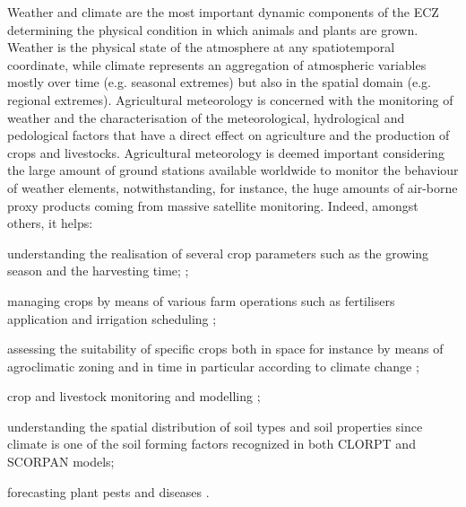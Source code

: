 \documentclass[authoryear,preprint,review,12pt]{elsarticle}
\begin{document}

Weather and climate are the most important dynamic components of the ECZ determining the physical condition in which animals and plants are grown.
Weather is the physical state of the atmosphere at any spatiotemporal coordinate, while climate represents an aggregation of atmospheric variables mostly over time (e.g. seasonal extremes) but also in the spatial domain (e.g. regional extremes).
Agricultural meteorology is concerned with the monitoring of weather and the characterisation of the meteorological, hydrological and pedological factors that have a direct effect on agriculture and the production of crops and livestocks.
Agricultural meteorology is deemed important considering the large amount of ground stations available worldwide to monitor the behaviour of weather elements, notwithstanding, for instance, the huge amounts of air-borne proxy products coming from massive satellite monitoring.
Indeed, amongst others, it helps: 
    \begin{enumerate*}
        \item understanding the realisation of several crop parameters such as the growing season and the harvesting time;  \citep{Hoogenboom:agrometeo-swat:2000,Chou2019,Madhukar2021,Richmond2022};
        \item managing crops by means of various farm operations such as fertilisers application and irrigation scheduling \citep{Cammarano2021,Chen2020};
        \item assessing the suitability of specific crops both in space for instance by means of agroclimatic zoning and in time in particular according to climate change \citep{Rokochynskiy2020,Jiang2020};
        \item crop and livestock monitoring and modelling \citep{Vogel2021,Zhang2022};
        \item understanding the spatial distribution of soil types and soil properties since climate is one of the soil forming factors recognized in both CLORPT \citep{jenny:clorpt:1941} and SCORPAN \citep{McBratney:scorpan:2003} models;
        \item forecasting plant pests and diseases \citep{IPM_decisions}.
    \end{enumerate*}
\end{document}
